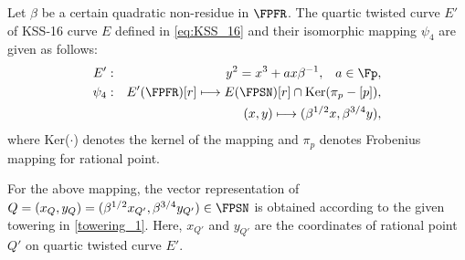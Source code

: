 Let $\beta$ be a certain quadratic non-residue in $\FPFR$.  The quartic twisted curve $E'$ of KSS-16  curve $E$ defined in \eqref{eq:KSS_16} and  their isomorphic mapping $\psi_4$ are given as follows:
\begin{eqnarray} 
	E'&:&y^2=x^3+ax\beta^{-1},\;\;\;a\in\Fp, \label{twisted_E} \\ 
	\psi_4&:&E'(\FPFR)[r] \longmapsto E(\FPSN)[r]\cap {\rm Ker}(\pi_p-[p]),\nonumber\\
	&& \quad \quad (x,y)\longmapsto (\beta^{1/2}x,\beta^{3/4}y),\label{map1}
\end{eqnarray}
where Ker($\cdot$) denotes the kernel of the mapping and $\pi_p$ denotes Frobenius mapping  for rational point.

For the above mapping, the vector representation of $Q = (x_{Q},y_Q) = (\beta^{1/2}x_{Q'},\beta^{3/4}y_{Q'}) \in \FPSN$ is obtained according to the given towering in \eqref{towering_1}.
Here, $x_{Q'}$ and $y_{Q'}$ are the coordinates of rational point $Q'$ on quartic twisted curve $E'$. 




